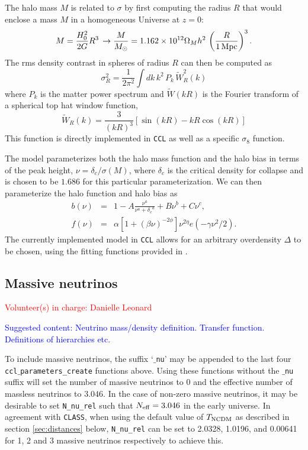 \documentclass[\docopts]{\docclass}
\newcommand{\vol}[1]{\textcolor{red}{Volunteer(s) in charge: #1}}
\newcommand{\cont}[1]{\textcolor{blue}{Suggested content: #1}}
\newcommand{\ccl}{{\tt CCL}\xspace}
\begin{document}
The halo mass $M$ is related to $\sigma$ by first computing the radius $R$ that would enclose a mass $M$ in a homogeneous Universe at $z=0$:
\begin{equation}
  M=\frac{H_0^2}{2G}R^3\,\rightarrow \frac{M}{M_\odot}=1.162\times10^{12}\Omega_Mh^2\,\left(\frac{R}{1\,{\rm Mpc}}\right)^3.
\end{equation}
The rms density contrast in spheres of radius $R$ can then be computed as
\begin{equation}
  \sigma_R^2 = \frac{1}{2\pi^2}\int dk\,k^2\,P_k\,\tilde{W}_R^2(k)
  \label{eq:sigR}
\end{equation}
where $P_k$ is the matter power spectrum and $\tilde{W}(kR)$ is the Fourier transform of a spherical top hat window function,
\begin{equation}
\tilde{W}_R(k) = \frac{3}{(kR)^3}[\sin(kR)-kR\cos(kR)]
\end{equation}
%
This function is directly implemented in \ccl as well as a specific $\sigma_8$ function.

The \citet{Tinker2010} model parameterizes both the halo mass function and the halo bias in terms of the peak height, $\nu = \delta_c / \sigma(M)$, where $\delta_c$ is the critical density for collapse and is chosen to be $1.686$ for this particular parameterization. We can then parameterize the halo function and halo bias as
\begin{eqnarray}
  b(\nu) &=& 1 - A\frac{\nu^a}{\nu^a + {\delta_c}^a} + B\nu^b+C\nu^c,\\
  f(\nu) &=& \alpha[1+(\beta\nu)^{-2\phi}]\nu^{2\eta}e(-\gamma\nu^2/2).
\end{eqnarray}
The currently implemented model in \ccl allows for an arbitrary overdensity $\Delta$ to be chosen, using the fitting functions provided in \citet{Tinker2010}.

\subsection{Massive neutrinos}
\vol{Danielle Leonard}

\cont{Neutrino mass/density definition. Transfer function. Definitions of hierarchies etc.}

To include massive neutrinos, the suffix `{\tt $\_$nu}' may be appended to the last four {\tt ccl$\_$parameters\_create} functions above. Using these functions without the {\tt $\_$nu} suffix will set the number of massive neutrinos to 0 and the effective number of massless neutrinos to $3.046$. In the case of non-zero massive neutrinos, it may be desirable to set {\tt N\_nu\_rel} such that $N_{\rm eff}=3.046$ in the early universe. In agreement with {\tt CLASS}, when using the default value of $T_{\rm NCDM}$ as described in section \ref{sec:distances} below, {\tt N\_nu\_rel} can be set to 2.0328, 1.0196, and 0.00641 for 1, 2 and 3 massive neutrinos respectively to achieve this.
\end{document}

